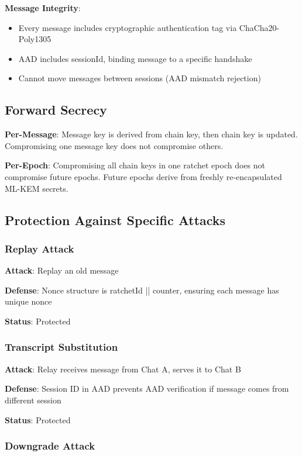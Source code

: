 \documentclass[11pt,a4paper,oneside]{article}
\begin{document}
\textbf{Message Integrity}:
\begin{itemize}
\item Every message includes cryptographic authentication tag via ChaCha20-Poly1305
\item AAD includes sessionId, binding message to a specific handshake
\item Cannot move messages between sessions (AAD mismatch rejection)
\end{itemize}

\subsection{Forward Secrecy}

\textbf{Per-Message}:
Message key is derived from chain key, then chain key is updated. Compromising one message key does not compromise others.

\textbf{Per-Epoch}:
Compromising all chain keys in one ratchet epoch does not compromise future epochs. Future epochs derive from freshly re-encapsulated ML-KEM secrets.

\subsection{Protection Against Specific Attacks}

\subsubsection{Replay Attack}

\textbf{Attack}: Replay an old message

\textbf{Defense}: Nonce structure is ratchetId || counter, ensuring each message has unique nonce

\textbf{Status}: \checkmark Protected

\subsubsection{Transcript Substitution}

\textbf{Attack}: Relay receives message from Chat A, serves it to Chat B

\textbf{Defense}: Session ID in AAD prevents AAD verification if message comes from different session

\textbf{Status}: \checkmark Protected

\subsubsection{Downgrade Attack}
\end{document}
